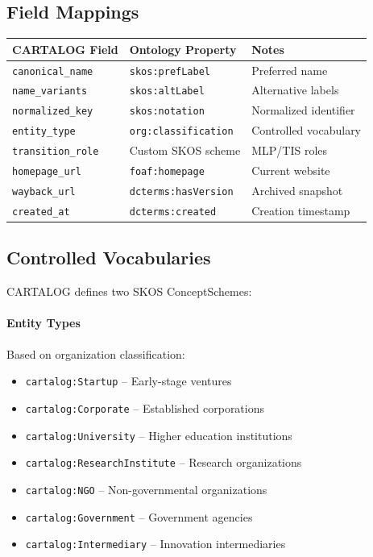 \documentclass[../main.tex]{subfiles}
\begin{document}
\subsection{Field Mappings}

\tableminimal
\begin{center}
\begin{tabular}{@{}llp{5cm}@{}}
\toprule
\textbf{CARTALOG Field} & \textbf{Ontology Property} & \textbf{Notes} \\
\midrule
\texttt{canonical\_name} & \texttt{skos:prefLabel} & Preferred name \\
\texttt{name\_variants} & \texttt{skos:altLabel} & Alternative labels \\
\texttt{normalized\_key} & \texttt{skos:notation} & Normalized identifier \\
\texttt{entity\_type} & \texttt{org:classification} & Controlled vocabulary \\
\texttt{transition\_role} & Custom SKOS scheme & MLP/TIS roles \\
\texttt{homepage\_url} & \texttt{foaf:homepage} & Current website \\
\texttt{wayback\_url} & \texttt{dcterms:hasVersion} & Archived snapshot \\
\texttt{created\_at} & \texttt{dcterms:created} & Creation timestamp \\
\bottomrule
\end{tabular}
\end{center}

\subsection{Controlled Vocabularies}

\textsc{CARTALOG} defines two SKOS ConceptSchemes:

\paragraph{Entity Types} Based on organization classification:
\begin{itemize}[leftmargin=*, itemsep=0.1em]
\item \texttt{cartalog:Startup} -- Early-stage ventures
\item \texttt{cartalog:Corporate} -- Established corporations
\item \texttt{cartalog:University} -- Higher education institutions
\item \texttt{cartalog:ResearchInstitute} -- Research organizations
\item \texttt{cartalog:NGO} -- Non-governmental organizations
\item \texttt{cartalog:Government} -- Government agencies
\item \texttt{cartalog:Intermediary} -- Innovation intermediaries
\end{itemize}
\end{document}
